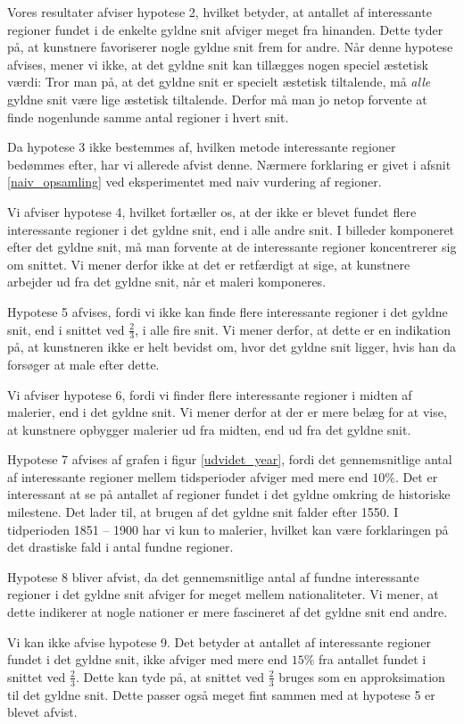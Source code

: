 {Vores resultater afviser hypotese 2, hvilket betyder, at antallet af
interessante regioner fundet i de enkelte gyldne snit afviger meget fra
hinanden.  Dette tyder på, at kunstnere favoriserer nogle gyldne snit
frem for andre. Når denne hypotese afvises, mener vi ikke, at det gyldne
snit kan tillægges nogen speciel æstetisk værdi: Tror man på, at det
gyldne snit er specielt æstetisk tiltalende, må \emph{alle} gyldne snit
være lige æstetisk tiltalende. Derfor må man jo netop forvente at finde
nogenlunde samme antal regioner i hvert snit.

Da hypotese 3 ikke bestemmes af, hvilken metode interessante regioner
bedømmes efter, har vi allerede afvist denne. Nærmere forklaring er
givet i afsnit \ref{naiv_opsamling} ved eksperimentet med naiv vurdering
af regioner.

Vi afviser hypotese 4, hvilket fortæller os, at der ikke er blevet
fundet flere interessante regioner i det gyldne snit, end i alle andre
snit.  I billeder komponeret efter det gyldne snit, må man forvente at
de interessante regioner koncentrerer sig om snittet. Vi mener derfor
ikke at det er retfærdigt at sige, at kunstnere arbejder ud fra det
gyldne snit, når et maleri komponeres.

Hypotese 5 afvises, fordi vi ikke kan finde flere interessante regioner
i det gyldne snit, end i snittet ved $\frac{2}{3}$, i alle fire snit. Vi
mener derfor, at dette er en indikation på, at kunstneren ikke er helt
bevidst om, hvor det gyldne snit ligger, hvis han da forsøger at male
efter dette.

Vi afviser hypotese 6, fordi vi finder flere interessante regioner i
midten af malerier, end i det gyldne snit. Vi mener derfor at der er
mere belæg for at vise, at kunstnere opbygger malerier ud fra midten,
end ud fra det gyldne snit.

Hypotese 7 afvises af grafen i figur \ref{udvidet_year}, fordi det
gennemsnitlige antal af interessante regioner mellem tidsperioder
afviger med mere end $10 \%$. Det er interessant at se på antallet af
regioner fundet i det gyldne omkring de historiske milestene. Det lader
til, at brugen af det gyldne snit falder efter 1550. I tidperioden 1851
-- 1900 har vi kun to malerier, hvilket kan være forklaringen på det
drastiske fald i antal fundne regioner.

Hypotese 8 bliver afvist, da det gennemsnitlige antal af fundne
interessante regioner i det gyldne snit afviger for meget mellem
nationaliteter. Vi mener, at dette indikerer at nogle nationer er mere
fascineret af det gyldne snit end andre.

Vi kan ikke afvise hypotese 9. Det betyder at antallet af interessante
regioner fundet i det gyldne snit, ikke afviger med mere end $15 \%$ fra
antallet fundet i snittet ved $\frac{2}{3}$. Dette kan tyde på, at
snittet ved $\frac{2}{3}$ bruges som en approksimation til det gyldne
snit. Dette passer også meget fint sammen med at hypotese 5 er blevet
afvist.

} %

